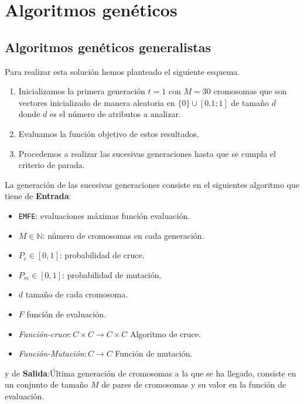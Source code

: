 
\section{ Algoritmos genéticos}
\subsection{Algoritmos genéticos generalistas}  
Para realizar esta solución hemos planteado el siguiente esquema. 

\begin{enumerate}
    \item Inicializamos la primera generación $t=1$ con $M = 30$ cromosomas que son
    vectores inicializado de manera aleatoria en $\{0\} \cup [0.1; 1]$ de tamaño $d$  donde $d$ es el número de atributos a analizar.  
    \item  Evaluamos la función objetivo de estos resultados. 
    \item Procedemos a realizar las sucesivas generaciones hasta que se cumpla el criterio de parada. 
\end{enumerate}

La generación de las sucesivas generaciones consiste en el siguientes algoritmo que tiene de  
\textbf{Entrada}:
        \begin{itemize}
          \item \texttt{EMFE}: evaluaciones máximas función evaluación.
          \item $M \in \mathbb{N}$: número de cromosomas en cada generación. 
          \item $P_c \in [0,1]$: probabilidad de cruce. 
          \item $P_m \in [0,1]$: probabilidad de mutación. 
          \item $d$ tamaño de cada cromosoma. 
          \item $F$ función de evaluación. 
          \item \textit{Función-cruce}$: C \times C \longrightarrow C \times C$ Algoritmo de cruce. 
          \item \textit{Función-Mutación}$: C \longrightarrow C $ Función de mutación. 
        \end{itemize}

y de 
\textbf{Salida}:Última generación de cromosomas a la que se ha llegado,
        consiste en un conjunto de tamaño $M$ de pares de cromosomas y su valor en la función de evaluación.

